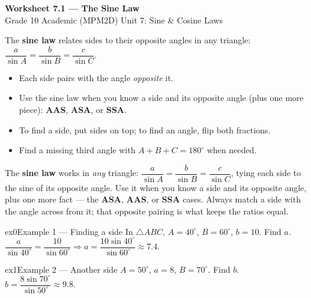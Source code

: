 \documentclass[11pt]{article}
\begin{document}
\begin{center}
{\LARGE\bfseries\color{titleblue}Worksheet 7.1 --- The Sine Law}\\[2pt]
{\small Grade 10 Academic (MPM2D) \textperiodcentered{} Unit 7: Sine \& Cosine Laws}
\end{center}

\begin{ideabox}
The \textbf{sine law} relates sides to their opposite angles in any triangle: $\dfrac{a}{\sin A}=\dfrac{b}{\sin B}=\dfrac{c}{\sin C}$.
\begin{itemize}[leftmargin=*,itemsep=2pt]
  \item Each side pairs with the angle \emph{opposite} it.
  \item Use the sine law when you know a side and its opposite angle (plus one more piece): \textbf{AAS}, \textbf{ASA}, or \textbf{SSA}.
  \item To find a side, put sides on top; to find an angle, flip both fractions.
  \item Find a missing third angle with $A+B+C=180^\circ$ when needed.
\end{itemize}
\end{ideabox}

\begin{learnbox}
The \textbf{sine law} works in \emph{any} triangle: $\dfrac{a}{\sin A}=\dfrac{b}{\sin B}=\dfrac{c}{\sin C}$, tying each side to the sine of its opposite angle.
Use it when you know a side and its opposite angle, plus one more fact — the \textbf{ASA}, \textbf{AAS}, or \textbf{SSA} cases.
Always match a side with the angle across from it; that opposite pairing is what keeps the ratios equal.
\end{learnbox}


\begin{example}{ex0}{Example 1 --- Finding a side}
In $\triangle ABC$, $A=40^\circ$, $B=60^\circ$, $b=10$. Find $a$.
\soln $\dfrac{a}{\sin40^\circ}=\dfrac{10}{\sin60^\circ}\Rightarrow a=\dfrac{10\sin40^\circ}{\sin60^\circ}\approx7.4.$
\end{example}

\begin{example}{ex1}{Example 2 --- Another side}
$A=50^\circ$, $a=8$, $B=70^\circ$. Find $b$.
\soln $b=\dfrac{8\sin70^\circ}{\sin50^\circ}\approx9.8.$
\end{example}
\end{document}
